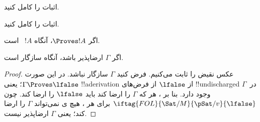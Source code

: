 \documentclass[../../../include/open-logic-section]{subfiles}
\begin{document}
\begin{prob}
اثبات  را کامل کنید.
\end{prob}
\tagendprob

\begin{prob}
اثبات  را کامل کنید.
\end{prob}
\tagendprob

\begin{cor}
اگر $\Proves !A$، آنگاه $!A$~ است.
\end{cor}

\begin{cor}
اگر $\Gamma$ ارضاپذیر باشد، آنگاه سازگار است.
\end{cor}

\begin{proof}
عکس نقیض را ثابت می‌کنیم. فرض کنید $\Gamma$ سازگار نباشد. در این صورت
$\Gamma \Proves \lfalse$؛ یعنی !!a{derivation} از $\lfalse$ از فرض‌های
!!{undischarged} در~$\Gamma$ وجود دارد. بنا بر ،
هر 
که $\Gamma$ را ارضا کند باید $\lfalse$ را ارضا کند. چون
$\iftag{FOL}{\Sat/{M}}{\pSat/{v}}{\lfalse}$ برای هر
، هیچ
ی نمی‌تواند $\Gamma$ را ارضا
کند؛ یعنی $\Gamma$ ارضاپذیر نیست.
\end{proof}
\end{document}
